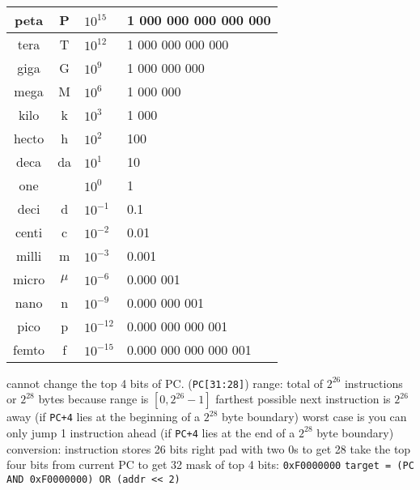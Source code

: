 \documentclass[12pt]{article}
\begin{document}
\begin{spacing}{0.8}
\begin{multicols*}{2}
\begin{flushleft}
\begin{outline}[longenum]
 \\
\begin{tabular}{|c c l l|}                                   \hline
peta  & P     & $10^{ 15}$ & \hfill 1 000 000 000 000 000 \\ \hline
tera  & T     & $10^{ 12}$ & \hfill     1 000 000 000 000 \\ \hline
giga  & G     & $10^{  9}$ & \hfill         1 000 000 000 \\ \hline
mega  & M     & $10^{  6}$ & \hfill             1 000 000 \\ \hline
kilo  & k     & $10^{  3}$ & \hfill                 1 000 \\ \hline
hecto & h     & $10^{  2}$ & \hfill                   100 \\ \hline
deca  & da    & $10^{  1}$ & \hfill                    10 \\ \hline
one   &       & $10^{ 0 }$ & \hfill       1 \hfill \hfill \\ \hline
deci  & d     & $10^{- 1}$ & 0.1                          \\ \hline
centi & c     & $10^{- 2}$ & 0.01                         \\ \hline
milli & m     & $10^{- 3}$ & 0.001                        \\ \hline
micro & $\mu$ & $10^{- 6}$ & 0.000 001                    \\ \hline
nano  & n     & $10^{- 9}$ & 0.000 000 001                \\ \hline
pico  & p     & $10^{-12}$ & 0.000 000 000 001            \\ \hline
femto & f     & $10^{-15}$ & 0.000 000 000 000 001        \\ \hline
\end{tabular}

  \1 cannot change the top 4 bits of PC. (\verb|PC[31:28]|)
  \1 range:
    \2 total of $2^{26}$ instructions or $2^{28}$ bytes
      \3 because range is $[0,2^{26}-1]$
    \2 farthest possible next instruction is $2^{26}$ away (if \verb|PC+4| lies at the beginning of a $2^{28}$ byte boundary)
    \2 worst case is you can only jump 1 instruction ahead (if \verb|PC+4| lies at the end of a $2^{28}$ byte boundary)
  \1 conversion:
    \2 instruction stores 26 bits
    \2 right pad with two 0s to get 28
    \2 take the top four bits from current PC to get 32
  \1 mask of top 4 bits: \verb|0xF0000000|
  \1 \verb|target = (PC AND 0xF0000000) OR (addr << 2)|


\end{outline}
\end{flushleft}
\end{multicols*}
\end{spacing}
\end{document}
